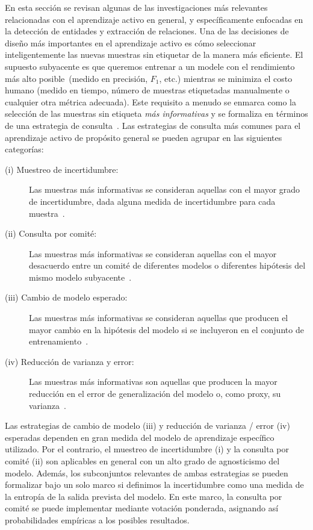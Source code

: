En esta sección se revisan algunas de las investigaciones más relevantes relacionadas con el aprendizaje activo en general, y específicamente enfocadas en la detección de entidades y extracción de relaciones.
Una de las decisiones de diseño más importantes en el aprendizaje activo es cómo seleccionar inteligentemente las nuevas muestras sin etiquetar de la manera más eficiente. El supuesto subyacente es que queremos entrenar a un
modele con el rendimiento más alto posible~(medido en precisión, $ F_1 $, etc.) mientras se minimiza el costo humano (medido en tiempo, número de muestras etiquetadas manualmente o cualquier otra métrica adecuada).
Este requisito a menudo se enmarca como la selección de las muestras sin etiqueta \textit{más informativas} y se formaliza en términos de una estrategia de consulta~\cite{seungquery}.
Las estrategias de consulta más comunes para el aprendizaje activo de propósito general se pueden agrupar en las siguientes categorías:

\begin{description}
  \item [(i) Muestreo de incertidumbre:] Las muestras más informativas se consideran aquellas con el mayor grado de incertidumbre, dada alguna medida de incertidumbre para cada muestra~\cite{Lewis1994148}.

  \item [(ii) Consulta por comité:] Las muestras más informativas se consideran aquellas con el mayor desacuerdo entre un comité de diferentes modelos o diferentes hipótesis del mismo modelo subyacente~\cite{seungquery}.

  \item [(iii) Cambio de modelo esperado:] Las muestras más informativas se consideran aquellas que producen el mayor cambio en la hipótesis del modelo si se incluyeron en el conjunto de entrenamiento~\cite{NIPS2007_3252}.

  \item [(iv) Reducción de varianza y error:] Las muestras más informativas son aquellas que producen la mayor reducción en el error de generalización del modelo o, como proxy, su varianza~\cite{roy2001toward}.
\end{description}

Las estrategias de cambio de modelo (iii) y reducción de varianza / error (iv) esperadas dependen en gran medida del modelo de aprendizaje específico utilizado.
Por el contrario, el muestreo de incertidumbre (i) y la consulta por comité (ii) son aplicables en general con un alto grado de agnosticismo del modelo.
Además, los subconjuntos relevantes de ambas estrategias se pueden formalizar bajo un solo marco si definimos la incertidumbre como una medida de la entropía de la salida prevista del modelo.
En este marco, la consulta por comité se puede implementar mediante votación ponderada, asignando así probabilidades empíricas a los posibles resultados.

